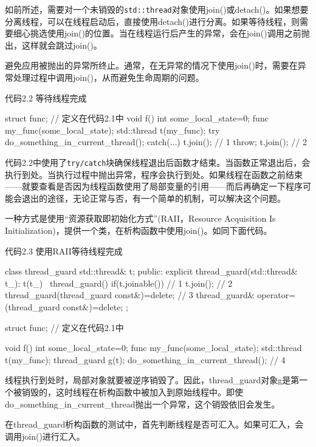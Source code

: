 
如前所述，需要对一个未销毁的\texttt{std::thread}对象使用join()或detach()。如果想要分离线程，可以在线程启动后，直接使用detach()进行分离。如果等待线程，则需要细心挑选使用join()的位置。当在线程运行后产生的异常，会在join()调用之前抛出，这样就会跳过join()。

避免应用被抛出的异常所终止。通常，在无异常的情况下使用join()时，需要在异常处理过程中调用join()，从而避免生命周期的问题。

代码2.2 等待线程完成

\begin{cpp}
struct func; // 定义在代码2.1中
void f()
{
  int some_local_state=0;
  func my_func(some_local_state);
  std::thread t(my_func);
  try
  {
    do_something_in_current_thread();
  }
  catch(...)
  {
    t.join();  // 1
    throw;
  }
  t.join();  // 2
}
\end{cpp}

代码2.2中使用了\texttt{try/catch}块确保线程退出后函数才结束。当函数正常退出后，会执行到处。当执行过程中抛出异常，程序会执行到处。如果线程在函数之前结束——就要查看是否因为线程函数使用了局部变量的引用——而后再确定一下程序可能会退出的途径，无论正常与否，有一个简单的机制，可以解决这个问题。

一种方式是使用“资源获取即初始化方式”(RAII，Resource Acquisition Is Initialization)，提供一个类，在析构函数中使用join()。如同下面代码。

代码2.3 使用RAII等待线程完成

\begin{cpp}
class thread_guard
{
  std::thread& t;
public:
  explicit thread_guard(std::thread& t_):
    t(t_)
  {}
  ~thread_guard()
  {
    if(t.joinable()) // 1
    {
      t.join();      // 2
    }
  }
  thread_guard(thread_guard const&)=delete;   // 3
  thread_guard& operator=(thread_guard const&)=delete;
};

struct func; // 定义在代码2.1中

void f()
{
  int some_local_state=0;
  func my_func(some_local_state);
  std::thread t(my_func);
  thread_guard g(t);
  do_something_in_current_thread();
}    // 4
\end{cpp}

线程执行到处时，局部对象就要被逆序销毁了。因此，thread\_guard对象g是第一个被销毁的，这时线程在析构函数中被加入到原始线程中。即使do\_something\_in\_current\_thread抛出一个异常，这个销毁依旧会发生。

在thread\_guard析构函数的测试中，首先判断线程是否可汇入。如果可汇入，会调用join()进行汇入。

